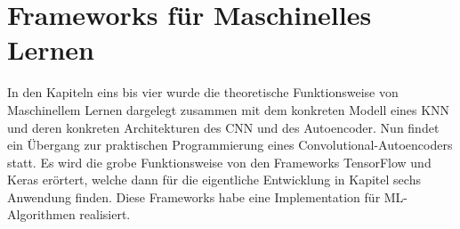 
\chapter{Frameworks für Maschinelles Lernen}
In den Kapiteln eins bis vier wurde die theoretische Funktionsweise von
Maschinellem Lernen dargelegt zusammen mit dem konkreten Modell eines KNN und deren
konkreten Architekturen des CNN und des Autoencoder.
Nun findet ein Übergang zur praktischen Programmierung eines
Convolutional-Autoencoders statt. Es wird die grobe Funktionsweise von den
Frameworks TensorFlow und Keras erörtert, welche dann
für die eigentliche Entwicklung in Kapitel sechs Anwendung finden.
Diese Frameworks habe eine Implementation für ML-Algorithmen realisiert.
\para{}
\bigskip

